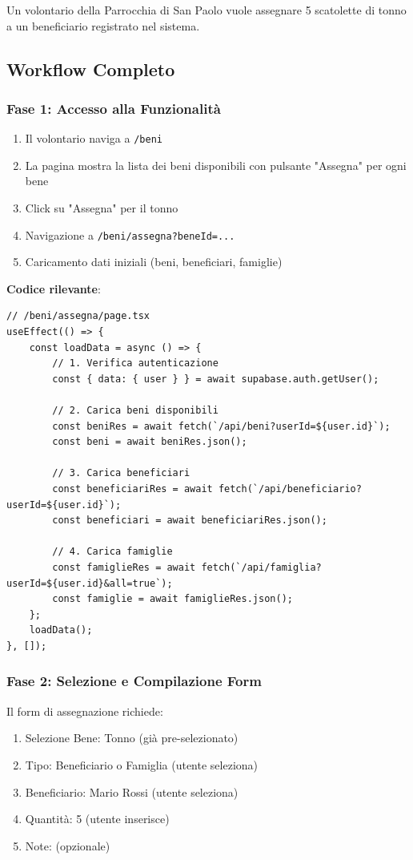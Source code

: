 \documentclass{article}
\begin{document}
Un volontario della Parrocchia di San Paolo vuole assegnare 5 scatolette di tonno a un beneficiario registrato nel sistema.

\subsection{Workflow Completo}

\subsubsection{Fase 1: Accesso alla Funzionalità}

\begin{enumerate}[leftmargin=*]
\item Il volontario naviga a \texttt{/beni}
\item La pagina mostra la lista dei beni disponibili con pulsante "Assegna" per ogni bene
\item Click su "Assegna" per il tonno
\item Navigazione a \texttt{/beni/assegna?beneId=...}
\item Caricamento dati iniziali (beni, beneficiari, famiglie)
\end{enumerate}

\textbf{Codice rilevante}:
\begin{lstlisting}
// /beni/assegna/page.tsx
useEffect(() => {
    const loadData = async () => {
        // 1. Verifica autenticazione
        const { data: { user } } = await supabase.auth.getUser();
        
        // 2. Carica beni disponibili
        const beniRes = await fetch(`/api/beni?userId=${user.id}`);
        const beni = await beniRes.json();
        
        // 3. Carica beneficiari
        const beneficiariRes = await fetch(`/api/beneficiario?userId=${user.id}`);
        const beneficiari = await beneficiariRes.json();
        
        // 4. Carica famiglie
        const famiglieRes = await fetch(`/api/famiglia?userId=${user.id}&all=true`);
        const famiglie = await famiglieRes.json();
    };
    loadData();
}, []);
\end{lstlisting}

\subsubsection{Fase 2: Selezione e Compilazione Form}

Il form di assegnazione richiede:
\begin{enumerate}[leftmargin=*]
\item Selezione Bene: Tonno (già pre-selezionato)
\item Tipo: Beneficiario o Famiglia (utente seleziona)
\item Beneficiario: Mario Rossi (utente seleziona)
\item Quantità: 5 (utente inserisce)
\item Note: (opzionale)
\end{enumerate}
\end{document}
